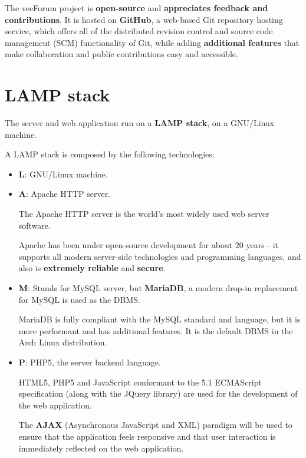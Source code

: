 \documentclass[12pt]{report}
\renewcommand\emph{\textbf}
\begin{document}
                The veeForum project is \emph{open-source} and \emph{appreciates feedback and contributions}. It is hosted on \emph{GitHub}, a web-based Git repository hosting service, which offers all of the distributed revision control and source code management (SCM) functionality of Git, while adding \emph{additional features} that make collaboration and public contributions easy and accessible.

            \section{LAMP stack}
                The server and web application run on a \emph{LAMP stack}, on a GNU/Linux machine.

                A LAMP stack is composed by the following technologies:

                \begin{itemize}
                    \item \emph{L}: GNU/Linux machine.
                    \item \emph{A}: Apache HTTP server.

                     The Apache HTTP server is the world's most widely used web server software.

                     Apache has been under open-source development for about 20 years - it supports all modern server-side technologies and programming languages, and also is \emph{extremely reliable} and \emph{secure}.

                    \item \emph{M}: Stands for MySQL server, but \emph{MariaDB}, a modern drop-in replacement for MySQL is used as the DBMS. 

                    MariaDB is fully compliant with the MySQL standard and language, but it is more performant and has additional features. It is the default DBMS in the Arch Linux distribution.

                    \item \emph{P}: PHP5, the server backend language. 

                    HTML5, PHP5 and JavaScript conformant to the 5.1 ECMAScript specification (along with the JQuery library) are used for the development of the web application. 

                    The \emph{AJAX} (Asynchronous JavaScript and XML) paradigm will be used to ensure that the application feels responsive and that user interaction is immediately reflected on the web application.

                \end{itemize}
               
\end{document}
